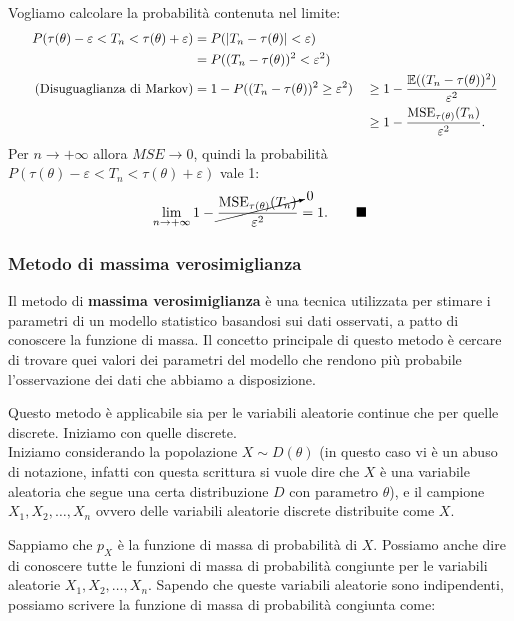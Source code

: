 \begin{dimostrazione}
Vogliamo calcolare la probabilità contenuta nel limite:
\begin{alignat*}{2}
    P(\tau(\theta) - \varepsilon < T_n < \tau(\theta) + \varepsilon) &= P(|T_n - \tau(\theta)| < \varepsilon) \\ 
    &= P((T_n - \tau(\theta))^2 < \varepsilon^2) \\
    \tag{Disuguaglianza di Markov}
    &= 1 - P((T_n - \tau(\theta))^2 \geq \varepsilon^2) 
        && \geq 1 - \frac{\mathbb{E}((T_n - \tau(\theta))^2)}{\varepsilon^2} \\
        &&&\geq 1 - \frac{\operatorname{MSE}_{\tau(\theta)}(T_n)}{\varepsilon^2}.
\end{alignat*}
Per $n \to +\infty$ allora $MSE \to 0$, quindi la probabilità $P(\tau(\theta) - \varepsilon < T_n < \tau(\theta) + \varepsilon)$ vale 1:\[
    \lim_{n \rightarrow +\infty} 1- \cancelto{0}{\frac{\operatorname{MSE}_{\tau(\theta)}(T_n)}{\varepsilon^2}} = 1. \tag*{$\blacksquare$}
\]
\end{dimostrazione}

\subsubsection{Metodo di massima verosimiglianza}

Il metodo di \textbf{massima verosimiglianza} è una tecnica utilizzata per stimare i parametri di un modello statistico basandosi sui dati osservati, a patto di conoscere la funzione di massa. Il concetto principale di questo metodo è cercare di trovare quei valori dei parametri del modello che rendono più probabile l'osservazione dei dati che abbiamo a disposizione.

\noindent Questo metodo è applicabile sia per le variabili aleatorie continue che per quelle discrete. Iniziamo con quelle discrete.
\\
\noindent Iniziamo considerando la popolazione $X \sim D(\theta)$ (in questo caso vi è un abuso di notazione, infatti con questa scrittura si vuole dire che $X$ è una variabile aleatoria che segue una certa distribuzione $D$ con parametro $\theta$), e il campione $X_1, X_2, \ldots, X_n$ ovvero delle variabili aleatorie discrete distribuite come $X$.

\noindent Sappiamo che $p_X$ è la funzione di massa di probabilità di $X$. Possiamo anche dire di conoscere tutte le funzioni di massa di probabilità congiunte per le variabili aleatorie $X_1, X_2, \ldots, X_n$. Sapendo che queste variabili aleatorie sono indipendenti, possiamo scrivere la funzione di massa di probabilità congiunta come:

